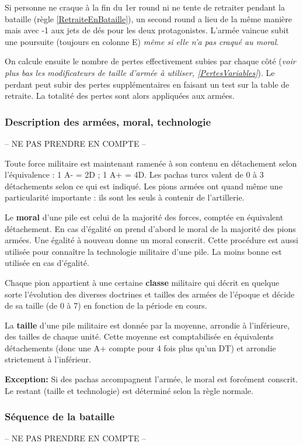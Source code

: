 Si personne ne craque à la fin du 1er round ni ne tente
de retraiter pendant la bataille (règle \ref{RetraiteEnBataille}), un second round
a lieu de la même manière mais avec -1 aux jets de dés pour les deux protagonistes.
L'armée vaincue subit une poursuite (toujours en colonne E)
\textit{même si elle n'a pas craqué au moral}.

On calcule ensuite le nombre de pertes effectivement subies par chaque côté
(\textit{voir plus bas les modificateurs de taille d'armée à utiliser, \ref{PertesVariables}}).
Le perdant peut subir des pertes supplémentaires en faisant un test sur la
table de retraite. La totalité des pertes sont alors appliquées aux armées.

\subsubsection{Description des armées, moral, technologie}
-- NE PAS PRENDRE EN COMPTE --

Toute force militaire est maintenant ramenée à son contenu en détachement selon
l'équivalence : 1 A- = 2D ; 1 A+ = 4D.
Les pachas turcs valent de 0 à 3 détachements selon ce qui est indiqué.
Les pions armées ont quand même une particularité importante : ils sont
les seuls à contenir de l'artillerie.

Le \textbf{moral} d'une pile est celui de la majorité des forces, comptée en équivalent détachement.
En cas d'égalité on prend d'abord le moral de la majorité des pions armées. Une égalité
à nouveau donne un moral conscrit.
Cette procédure est aussi utilisée pour connaître la technologie
militaire d'une pile. La moins bonne est utilisée en cas d'égalité.

Chaque pion appartient à une certaine \textbf{classe} militaire
qui décrit en quelque sorte l'évolution des diverses doctrines et tailles
des armées de l'époque et
décide de sa taille (de 0 à 7) en fonction de la période en cours.

La \textbf{taille} d'une pile militaire est donnée par la moyenne,
arrondie à l'inférieure, des tailles de chaque unité. Cette moyenne
est comptabilisée en équivalents détachements (donc une A+
compte pour 4 fois plus qu'un DT) et arrondie strictement à l'inférieur.

\textbf{Exception:} Si des pachas accompagnent l'armée, le moral est forcément
conscrit. Le restant (taille et technologie) est déterminé selon la règle normale.

\subsubsection{Séquence de la bataille}
-- NE PAS PRENDRE EN COMPTE --

